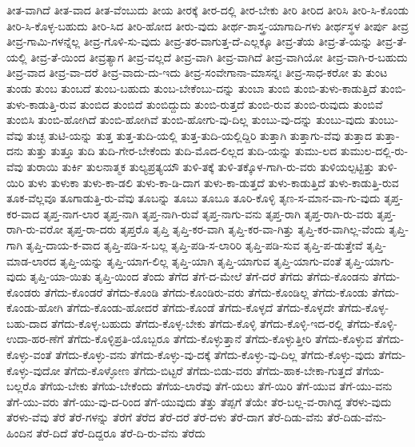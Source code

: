 {ತೀತ-ವಾಗಿದೆ
ತೀತ-ವಾದ
ತೀತ-ವೆಂಬುದು
ತೀಯ
ತೀರಕ್ಕೆ
ತೀರ-ದಲ್ಲಿ
ತೀರ-ಬೇಕು
ತೀರಿ
ತೀರಿದ
ತೀರಿಸಿ
ತೀರಿ-ಸಿ-ಕೊಂಡು
ತೀರಿ-ಸಿ-ಕೊಳ್ಳ-ಬಹುದು
ತೀರಿ-ಸಿದ
ತೀರಿ-ಹೋದ
ತೀರು-ವುದು
ತೀರ್ಥ-ಶಾಸ್ತ್ರ-ಯಾಗಾದಿ-ಗಳು
ತೀರ್ಥಸ್ಥಳ
ತೀರ್ಪು
ತೀವ್ರ
ತೀವ್ರ-ಗಾಮಿ-ಗಳನ್ನೆಲ್ಲ
ತೀವ್ರ-ಗೊಳಿ-ಸು-ವುದು
ತೀವ್ರ-ತರ-ವಾಗುತ್ತ-ದೆ-ಎಲ್ಲಕ್ಕೂ
ತೀವ್ರ-ತೆಯ
ತೀವ್ರ-ತೆ-ಯನ್ನು
ತೀವ್ರ-ತೆ-ಯಲ್ಲಿ
ತೀವ್ರ-ತೆ-ಯಿಂದ
ತೀವ್ರತ್ಯಾಗ
ತೀವ್ರ-ವಲ್ಲದೆ
ತೀವ್ರ-ವಾಗಿ
ತೀವ್ರ-ವಾಗಿದೆ
ತೀವ್ರ-ವಾಗಿಯೋ
ತೀವ್ರ-ವಾಗಿ-ರ-ಬಹುದು
ತೀವ್ರ-ವಾದ
ತೀವ್ರ-ವಾ-ದರೆ
ತೀವ್ರ-ವಾದು-ದು-ಇದು
ತೀವ್ರ-ಸಂವೇಗಾನಾ-ಮಾಸನ್ನಃ
ತೀವ್ರ-ಸಾಧ-ಕರೋ
ತು
ತುಂಟ
ತುಂಡು
ತುಂಬ
ತುಂಬದೆ
ತುಂಬ-ಬಹುದು
ತುಂಬ-ಬೇಕೆಂಬು-ದನ್ನು
ತುಂಬಾ
ತುಂಬಿ
ತುಂಬಿ-ತುಳು-ಕಾಡುತ್ತಿದೆ
ತುಂಬಿ-ತುಳು-ಕಾಡುತ್ತಿ-ರುವ
ತುಂಬಿದ
ತುಂಬಿದೆ
ತುಂಬಿದ್ದುದು
ತುಂಬಿ-ರುತ್ತದೆ
ತುಂಬಿ-ರುವ
ತುಂಬಿ-ರುವುದು
ತುಂಬಿವೆ
ತುಂಬಿಸಿ
ತುಂಬಿ-ಹೋಗಿದೆ
ತುಂಬಿ-ಹೋಗಿವೆ
ತುಂಬಿ-ಹೋಗು-ವು-ದಿಲ್ಲ
ತುಂಬು-ವು-ದನ್ನು
ತುಂಬು-ವುದು
ತುಂಬು-ವೆವು
ತುಚ್ಛ
ತುಟಿ-ಯನ್ನು
ತುತ್ತ
ತುತ್ತ-ತುದಿ-ಯಲ್ಲಿ
ತುತ್ತ-ತುದಿ-ಯಲ್ಲಿದ್ದಿರಿ
ತುತ್ತಾಗಿ
ತುತ್ತಾಗು-ವೆವು
ತುತ್ತಾದ
ತುತ್ತಾ-ದನು
ತುತ್ತು
ತುತ್ತೂ
ತುದಿ
ತುದಿ-ಗೇರ-ಬೇಕೆಂದು
ತುದಿ-ಮೊದ-ಲಿಲ್ಲದ
ತುದಿ-ಯನ್ನು
ತುಮು-ಲದ
ತುಮುಲ-ದಲ್ಲಿ-ರು-ವೆವು
ತುರಾಯಿ
ತುರ್ಕಿ
ತುಲನಾತ್ಮಕ
ತುಲ್ಯಪ್ರತ್ಯಯೌ
ತುಳಿ-ತಕ್ಕೆ
ತುಳಿ-ತಕ್ಕೊಳ-ಗಾಗಿ-ರು-ವರು
ತುಳಿಯಲ್ಪಟ್ಟಿತ್ತು
ತುಳಿ-ಯಿರಿ
ತುಳು
ತುಳುಕಾ
ತುಳು-ಕಾ-ಡಲಿ
ತುಳು-ಕಾ-ಡಿ-ದಾಗ
ತುಳು-ಕಾ-ಡುತ್ತದೆ
ತುಳು-ಕಾಡುತ್ತಿದೆ
ತುಳು-ಕಾಡುತ್ತಿ-ರುವ
ತೂಕ-ವೆಲ್ಲವೂ
ತೂಗಾಡುತ್ತಿ-ರು-ವೆವು
ತೂಬನ್ನು
ತೂಬು
ತೂಬೂ
ತೂರಿ-ಕೊಳ್ಳಿ
ತೃಣ-ಸ-ಮಾನ-ವಾ-ಗು-ವುದು
ತೃಪ್ತ-ಕರ-ವಾದ
ತೃಪ್ತ-ನಾಗ-ಲಾರ
ತೃಪ್ತ-ನಾಗಿ
ತೃಪ್ತ-ನಾಗಿ-ರುವೆ
ತೃಪ್ತ-ನಾಗು-ವನು
ತೃಪ್ತ-ರಾಗಿ
ತೃಪ್ತ-ರಾಗಿ-ರು-ವರು
ತೃಪ್ತ-ರಾಗಿ-ರು-ವರೋ
ತೃಪ್ತ-ರಾ-ದರು
ತೃಪ್ತರೊ
ತೃಪ್ತಿ
ತೃಪ್ತಿ-ಕರ-ವಾಗಿ
ತೃಪ್ತಿ-ಕರ-ವಾ-ಗಿತ್ತು
ತೃಪ್ತಿ-ಕರ-ವಾಗಿಲ್ಲ-ವೆಂದು
ತೃಪ್ತಿ-ಗಾಗಿ
ತೃಪ್ತಿ-ದಾಯ-ಕ-ವಾದ
ತೃಪ್ತಿ-ಪಡಿ-ಸ-ಬಲ್ಲ
ತೃಪ್ತಿ-ಪಡಿ-ಸ-ಲಾರಿರಿ
ತೃಪ್ತಿ-ಪಡಿ-ಸುವ
ತೃಪ್ತಿ-ಪ-ಡುತ್ತೇವೆ
ತೃಪ್ತಿ-ಮಾಡ-ಲಾರದ
ತೃಪ್ತಿ-ಯನ್ನು
ತೃಪ್ತಿ-ಯಾಗ-ಲಿಲ್ಲ
ತೃಪ್ತಿ-ಯಾಗಿ
ತೃಪ್ತಿ-ಯಾಗುವ
ತೃಪ್ತಿ-ಯಾಗು-ವಂತೆ
ತೃಪ್ತಿ-ಯಾಗು-ವುದು
ತೃಪ್ತಿ-ಯಾ-ಯಿತು
ತೃಪ್ತಿ-ಯಿಂದ
ತೆಂದು
ತೆಗೆದ
ತೆಗೆ-ದ-ಮೇಲೆ
ತೆಗೆ-ದರೆ
ತೆಗೆದು
ತೆಗೆದು-ಕೊಂಡನು
ತೆಗೆದು-ಕೊಂಡರು
ತೆಗೆದು-ಕೊಂಡರೆ
ತೆಗೆದು-ಕೊಂಡಿ
ತೆಗೆದು-ಕೊಂಡಿರು-ವರು
ತೆಗೆದು-ಕೊಂಡಿಲ್ಲ
ತೆಗೆದು-ಕೊಂಡು
ತೆಗೆದು-ಕೊಂಡು-ಹೋಗಿ
ತೆಗೆದು-ಕೊಂಡು-ಹೋದರೆ
ತೆಗೆದು-ಕೊಂಡೆ
ತೆಗೆದು-ಕೊಳ್ಳದೆ
ತೆಗೆದು-ಕೊಳ್ಳದೇ
ತೆಗೆದು-ಕೊಳ್ಳ-ಬಹು-ದಾದ
ತೆಗೆದು-ಕೊಳ್ಳ-ಬಹುದು
ತೆಗೆದು-ಕೊಳ್ಳ-ಬೇಕು
ತೆಗೆದು-ಕೊಳ್ಳಿ
ತೆಗೆದು-ಕೊಳ್ಳಿ-ಇದ-ರಲ್ಲಿ
ತೆಗೆದು-ಕೊಳ್ಳಿ-ಉದಾ-ಹರ-ಣೆಗೆ
ತೆಗೆದು-ಕೊಳ್ಳಿಪ್ರತಿ-ಯೊಬ್ಬರೂ
ತೆಗೆದು-ಕೊಳ್ಳುತ್ತಾನೆ
ತೆಗೆದು-ಕೊಳ್ಳುತ್ತೀರಿ
ತೆಗೆದು-ಕೊಳ್ಳುವ
ತೆಗೆದು-ಕೊಳ್ಳು-ವಂತೆ
ತೆಗೆದು-ಕೊಳ್ಳು-ವನು
ತೆಗೆದು-ಕೊಳ್ಳು-ವು-ದಕ್ಕೆ
ತೆಗೆದು-ಕೊಳ್ಳು-ವು-ದಿಲ್ಲ
ತೆಗೆದು-ಕೊಳ್ಳು-ವುದು
ತೆಗೆದು-ಕೊಳ್ಳು-ವುದೋ
ತೆಗೆದು-ಕೊಳ್ಳೋಣ
ತೆಗೆದು-ಬಿಟ್ಟರೆ
ತೆಗೆದು-ಬಿಡು-ವರು
ತೆಗೆದು-ಹಾಕ-ಬೇಕಾ-ಗುತ್ತದೆ
ತೆಗೆಯ-ಬಲ್ಲರೊ
ತೆಗೆಯ-ಬೇಕು
ತೆಗೆಯ-ಬೇಕೆಂದು
ತೆಗೆಯ-ಲಾರೆವು
ತೆಗೆ-ಯಲು
ತೆಗೆ-ಯಿರಿ
ತೆಗೆ-ಯುವ
ತೆಗೆ-ಯು-ವನು
ತೆಗೆ-ಯು-ವರು
ತೆಗೆ-ಯು-ವು-ದ-ರಿಂದ
ತೆಗೆ-ಯುವುದು
ತೆತ್ತು
ತೆಪ್ಪಗೆ
ತೆಯೇ
ತೆರ-ಬಲ್ಲ-ವ-ರಾಗಿದ್ದ
ತೆರಳು-ವುದು
ತೆರಳು-ವೆವು
ತೆರೆ
ತೆರೆ-ಗಳನ್ನು
ತೆರೆಗೆ
ತೆರೆದ
ತೆರೆ-ದರೆ
ತೆರೆ-ದಳು
ತೆರೆ-ದಾಗ
ತೆರೆ-ದಿಡು-ವೆನು
ತೆರೆ-ದಿಡು-ವೆನು-ಹಿಂದಿನ
ತೆರೆ-ದಿದೆ
ತೆರೆ-ದಿದ್ದರೂ
ತೆರೆ-ದಿ-ರು-ವೆನು
ತೆರೆದು
}
